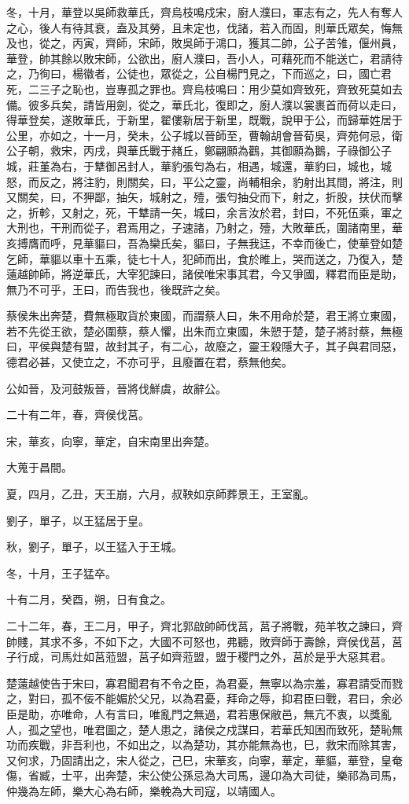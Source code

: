 \begin{pinyinscope}
冬，十月，華登以吳師救華氏，齊烏枝鳴戍宋，廚人濮曰，軍志有之，先人有奪人之心，後人有待其衰，盍及其勞，且未定也，伐諸，若入而固，則華氏眾矣，悔無及也，從之，丙寅，齊師，宋師，敗吳師于鴻口，獲其二帥，公子苦雂，偃州員，華登，帥其餘以敗宋師，公欲出，廚人濮曰，吾小人，可藉死而不能送亡，君請待之，乃徇曰，楊徽者，公徒也，眾從之，公自楊門見之，下而巡之，曰，國亡君死，二三子之恥也，豈專孤之罪也。齊烏枝鳴曰：用少莫如齊致死，齊致死莫如去備。彼多兵矣，請皆用劍，從之，華氏北，復即之，廚人濮以裳裹首而荷以走曰，得華登矣，遂敗華氏，于新里，翟僂新居于新里，既戰，說甲于公，而歸華姓居于公里，亦如之，十一月，癸未，公子城以晉師至，曹翰胡會晉荀吳，齊苑何忌，衛公子朝，救宋，丙戌，與華氏戰于赭丘，鄭翩願為鸛，其御願為鵝，子祿御公子城，莊堇為右，于犨御呂封人，華豹張匄為右，相遇，城還，華豹曰，城也，城怒，而反之，將注豹，則關矣，曰，平公之靈，尚輔相余，豹射出其間，將注，則又關矣，曰，不狎鄙，抽矢，城射之，殪，張匄抽殳而下，射之，折股，扶伏而擊之，折軫，又射之，死，干犨請一矢，城曰，余言汝於君，封曰，不死伍乘，軍之大刑也，干刑而從子，君焉用之，子速諸，乃射之，殪，大敗華氏，圍諸南里，華亥搏膺而呼，見華貙曰，吾為欒氏矣，貙曰，子無我迋，不幸而後亡，使華登如楚乞師，華貙以車十五乘，徒七十人，犯師而出，食於睢上，哭而送之，乃復入，楚薳越帥師，將逆華氏，大宰犯諫曰，諸侯唯宋事其君，今又爭國，釋君而臣是助，無乃不可乎，王曰，而告我也，後既許之矣。

蔡侯朱出奔楚，費無極取貨於東國，而謂蔡人曰，朱不用命於楚，君王將立東國，若不先從王欲，楚必圍蔡，蔡人懼，出朱而立東國，朱愬于楚，楚子將討蔡，無極曰，平侯與楚有盟，故封其子，有二心，故廢之，靈王殺隱大子，其子與君同惡，德君必甚，又使立之，不亦可乎，且廢置在君，蔡無他矣。

公如晉，及河鼓叛晉，晉將伐鮮虞，故辭公。

二十有二年，春，齊侯伐莒。

宋，華亥，向寧，華定，自宋南里出奔楚。

大蒐于昌間。

夏，四月，乙丑，天王崩，六月，叔鞅如京師葬景王，王室亂。

劉子，單子，以王猛居于皇。

秋，劉子，單子，以王猛入于王城。

冬，十月，王子猛卒。

十有二月，癸酉，朔，日有食之。

二十二年，春，王二月，甲子，齊北郭啟帥師伐莒，莒子將戰，苑羊牧之諫曰，齊帥賤，其求不多，不如下之，大國不可怒也，弗聽，敗齊師于壽餘，齊侯伐莒，莒子行成，司馬灶如莒蒞盟，莒子如齊蒞盟，盟于稷門之外，莒於是乎大惡其君。

楚薳越使告于宋曰，寡君聞君有不令之臣，為君憂，無寧以為宗羞，寡君請受而戮之，對曰，孤不佞不能媚於父兄，以為君憂，拜命之辱，抑君臣曰戰，君曰，余必臣是助，亦唯命，人有言曰，唯亂門之無過，君若惠保敝邑，無亢不衷，以獎亂人，孤之望也，唯君圖之，楚人患之，諸侯之戍謀曰，若華氏知困而致死，楚恥無功而疾戰，非吾利也，不如出之，以為楚功，其亦能無為也，巳，救宋而除其害，又何求，乃固請出之，宋人從之，己巳，宋華亥，向寧，華定，華貙，華登，皇奄傷，省臧，士平，出奔楚，宋公使公孫忌為大司馬，邊卬為大司徒，樂祁為司馬，仲幾為左師，樂大心為右師，樂輓為大司寇，以靖國人。


\end{pinyinscope}

